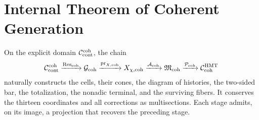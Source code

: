 \section{Internal Theorem of Coherent Generation}
\label{sec:pdfv2-coh-theorem}

\begin{theorem}
\label{thm:pdfv2-coh-internal-generation}
On the explicit domain \(\mathcal C_{\rm cont}^{\rm coh}\), the chain
\[
 \mathcal C_{\rm cont}^{\rm coh}
 \xrightarrow{\operatorname{Res}_{\rm coh}}
 \mathcal G_{\rm coh}
 \xrightarrow{\operatorname{pr}_{X,{\rm coh}}}
 X_{\chi,{\rm coh}}
 \xrightarrow{\mathcal A_{\rm coh}}
 \mathfrak M_{\rm coh}
 \xrightarrow{\mathcal P_{\rm coh}}
 \mathcal C_{\rm coh}^{\rm HMT}
\]
naturally constructs the cells, their cones, the diagram of histories, the
two-sided bar, the totalization, the nonadic terminal, and the
surviving fibers. It conserves the thirteen coordinates and all corrections as
multisections. Each stage admits, on its image, a projection that recovers
the preceding stage.
\end{theorem}

